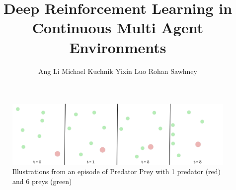 \documentclass{article}
\title{Deep Reinforcement Learning in Continuous Multi Agent Environments}
\author{
Ang Li \And%
Michael Kuchnik \And%
Yixin Luo \And%
Rohan Sawhney
}
\begin{document}

\maketitle

% 

\begin{figure}[h]
    \centering
    \includegraphics[width=\textwidth]{cover}
	\caption{Illustrations from an episode of Predator Prey with 1 predator (red) and 6 preys (green)}\label{Figure 1}
\end{figure}








\end{document}
